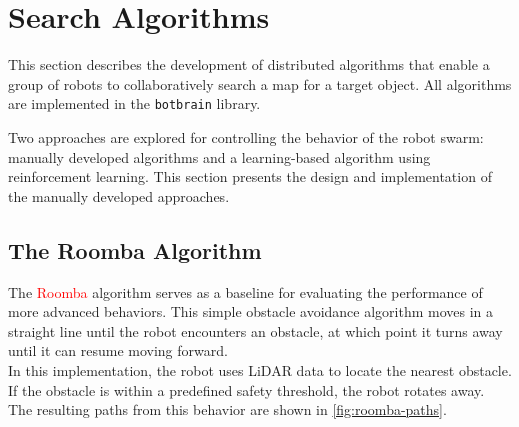 \section{Search Algorithms}
This section describes the development of distributed algorithms that enable a group of robots to collaboratively search a map for a target object. All algorithms are implemented in the \texttt{botbrain} library.

Two approaches are explored for controlling the behavior of the robot swarm: manually developed algorithms and a learning-based algorithm using reinforcement learning. This section presents the design and implementation of the manually developed approaches.

\subsection{The {\color{red}Roomba} Algorithm}
The \textcolor{red}{Roomba} algorithm serves as a baseline for evaluating the performance of more advanced behaviors. This simple obstacle avoidance algorithm moves in a straight line until the robot encounters an obstacle, at which point it turns away until it can resume moving forward. \\

In this implementation, the robot uses LiDAR data to locate the nearest obstacle. If the obstacle is within a predefined safety threshold, the robot rotates away. The resulting paths from this behavior are shown in \cref{fig:roomba-paths}.

